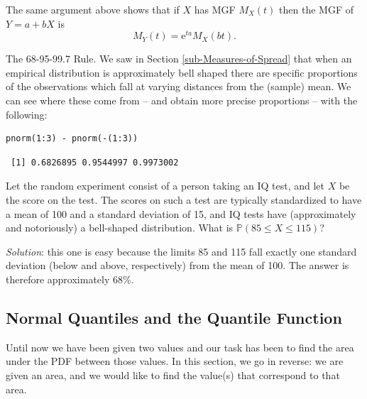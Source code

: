 \documentclass[captions=tableheading]{scrbook}
\begin{document}
\begin{fact}
The same argument above shows that if \(X\) has MGF \(M_{X}(t)\) then the MGF of \(Y=a+bX\) is
\begin{equation}
M_{Y}(t)=\mathrm{e}^{ta}M_{X}(bt).
\end{equation}
\end{fact}

\begin{example}
The 68-95-99.7 Rule. We saw in Section \ref{sub-Measures-of-Spread} that when an empirical distribution is approximately bell shaped there are specific proportions of the observations which fall at varying distances from the (sample) mean. We can see where these come from -- and obtain more precise proportions -- with the following:
\end{example}


\lstset{language=R}
\begin{lstlisting}
pnorm(1:3) - pnorm(-(1:3))
\end{lstlisting}

\begin{verbatim}
 [1] 0.6826895 0.9544997 0.9973002
\end{verbatim}

\begin{example}
Let the random experiment consist of a person taking an IQ test, and let \(X\) be the score on the test. The scores on such a test are typically standardized to have a mean of 100 and a standard deviation of 15, and IQ tests have (approximately and notoriously) a bell-shaped distribution. What is \(\mathbb{P}(85\leq X\leq115)\)?

\emph{Solution}: this one is easy because the limits 85 and 115 fall exactly one standard deviation (below and above, respectively) from the mean of 100. The answer is therefore approximately 68\%.
\end{example}
\subsection{Normal Quantiles and the Quantile Function}
\label{sec-1-3-1}
\label{sub-Normal-Quantiles-QF}


Until now we have been given two values and our task has been to find the area under the PDF between those values. In this section, we go in reverse: we are given an area, and we would like to find the value(s) that correspond to that area. 
\end{document}
